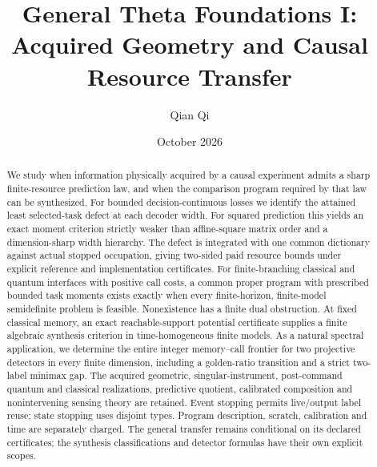 
\title[Acquired geometry and causal resource transfer]{General Theta Foundations I:\\Acquired Geometry and Causal Resource Transfer}
\author{Qian Qi}\date{October 2026}

\begin{abstract}
We study when information physically acquired by a causal experiment admits a sharp finite-resource prediction law, and when the comparison program required by that law can be synthesized. For bounded decision-continuous losses we identify the attained least selected-task defect at each decoder width. For squared prediction this yields an exact moment criterion strictly weaker than affine-square matrix order and a dimension-sharp width hierarchy. The defect is integrated with one common dictionary against actual stopped occupation, giving two-sided paid resource bounds under explicit reference and implementation certificates. For finite-branching classical and quantum interfaces with positive call costs, a common proper program with prescribed bounded task moments exists exactly when every finite-horizon, finite-model semidefinite problem is feasible. Nonexistence has a finite dual obstruction. At fixed classical memory, an exact reachable-support potential certificate supplies a finite algebraic synthesis criterion in time-homogeneous finite models. As a natural spectral application, we determine the entire integer memory--call frontier for two projective detectors in every finite dimension, including a golden-ratio transition and a strict two-label minimax gap. The acquired geometric, singular-instrument, post-command quantum and classical realizations, predictive quotient, calibrated composition and nonintervening sensing theory are retained. Event stopping permits live/output label reuse; state stopping uses disjoint types. Program description, scratch, calibration and time are separately charged. The general transfer remains conditional on its declared certificates; the synthesis classifications and detector formulas have their own explicit scopes.
\end{abstract}
\maketitle
